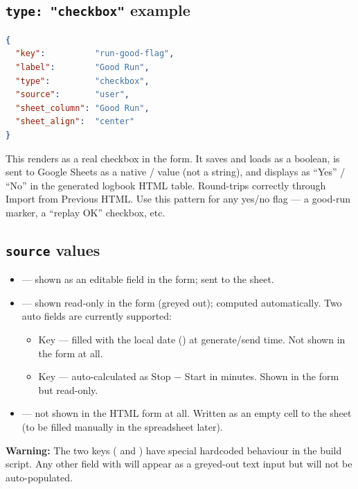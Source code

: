 \subsection*{\texttt{type: "checkbox"} example}

\begin{lstlisting}[language=JSON]
{
  "key":          "run-good-flag",
  "label":        "Good Run",
  "type":         "checkbox",
  "source":       "user",
  "sheet_column": "Good Run",
  "sheet_align":  "center"
}
\end{lstlisting}

This renders as a real checkbox in the form. It saves and loads as a boolean,
is sent to Google Sheets as a native / value (not a
string), and displays as ``Yes'' / ``No'' in the generated logbook HTML table.
Round-trips correctly through Import from Previous HTML. Use this pattern for
any yes/no flag --- a good-run marker, a ``replay OK'' checkbox, etc.

\subsection*{\texttt{source} values}

\begin{itemize}
    \item {} --- shown as an editable field in the form; sent to
          the sheet.
    \item {} --- shown read-only in the form (greyed out); computed
          automatically. Two auto fields are currently supported:
          \begin{itemize}
              \item Key  --- filled with the local date
                    () at generate/send time. Not shown in
                    the form at all.
              \item Key  --- auto-calculated as Stop
                    $-$ Start in minutes. Shown in the form but read-only.
          \end{itemize}
    \item {} --- not shown in the HTML form at all. Written
          as an empty cell to the sheet (to be filled manually in the
          spreadsheet later).
\end{itemize}

\begin{warningbox}
\textbf{Warning:} The two  keys ( and )
have special hardcoded behaviour in the build script. Any other field with
 will appear as a greyed-out text input but will not be
auto-populated.
\end{warningbox}


